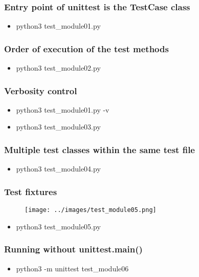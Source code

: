\documentclass[11pt]{beamer}
\begin{document}
\begin{frame}
\frametitle{Entry point of unittest is the TestCase class}

\begin{itemize}
	\item python3 test\_module01.py
\end{itemize}
\end{frame}

\begin{frame}
\frametitle{Order of execution of the test methods}

\begin{itemize}
	\item python3 test\_module02.py
\end{itemize}
\end{frame}

\begin{frame}
\frametitle{Verbosity control}

\begin{itemize}
	\item python3 test\_module01.py -v
	\item python3 test\_module03.py
\end{itemize}
\end{frame}

\begin{frame}
\frametitle{Multiple test classes within the same test file}

\begin{itemize}
	\item python3 test\_module04.py
\end{itemize}
\end{frame}

\begin{frame}
\frametitle{Test fixtures}
\begin{figure}[h]
	\centering
	\texttt{[image: ../images/test\_module05.png]}
\end{figure}
\begin{itemize}
	\item python3 test\_module05.py
\end{itemize}
\end{frame}

\begin{frame}
\frametitle{Running without unittest.main()}

\begin{itemize}
	\item python3 -m unittest test\_module06
\end{itemize}
\end{frame}
\end{document}
